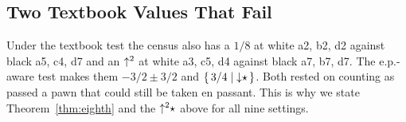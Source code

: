 \subsection{Two Textbook Values That Fail}
Under the textbook test the census also has a $1/8$ at white a2, b2, d2 against black a5, c4, d7 and an
$\mathord{\uparrow^{2}}$ at white a3, c5, d4 against black a7, b7, d7. The e.p.-aware test makes them $-3/2\pm3/2$ and
$\{\,3/4 \mid {\downarrow}\star\,\}$. Both rested on counting as passed a pawn that
could still be taken en passant. This is why we state Theorem~\ref{thm:eighth} and the $\mathord{\uparrow^{2}}\star$ above for
all nine settings.
